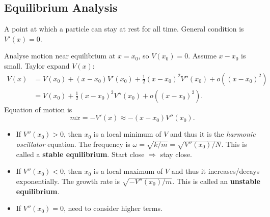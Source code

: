 \subsection{Equilibrium Analysis}
\begin{definition}
    A point at which a particle can stay at rest for all time. General condition is $ V'(x)=0 $. 
\end{definition}
Analyse motion near equilibrium at $ x=x_0 $, so $ V(x_0)=0 $. Assume $x-x_0$ is small. Taylor expand $V(x)$:
\begin{align*}
    V(x) &= V(x_0)+(x-x_0)V'(x_0)+\frac{1}{2}(x-x_0)^2V''(x_0)+o((x-x_0)^2)\\ 
    &= V(x_0)+\frac{1}{2}(x-x_0)^2V''(x_0)+o((x-x_0)^2).
\end{align*}
Equation of motion is 
\[
    m \ddot{x} = -V'(x) \approx - (x-x_0)V''(x_0).
\]

\begin{itemize}
    \item If $ V''(x_0)>0 $, then $x_0$ is a local minimum of $V$ and thus it is the \textit{harmonic oscillator} equation. The frequency is $ \omega = \sqrt{k/m} = \sqrt{V''(x_0)/N} $. This is called a \textbf{stable equilibrium}. Start close $\Rightarrow$ stay close.
    \item If $ V''(x_0)<0 $, then $x_0$ is a local maximum of $V$ and thus it increases/decays exponentially. The growth rate is $ \sqrt{-V''(x_0)/m} $. This is called an \textbf{unstable equilibrium}. 
    \item If $ V''(x_0)=0 $, need to consider higher terms.
\end{itemize}

